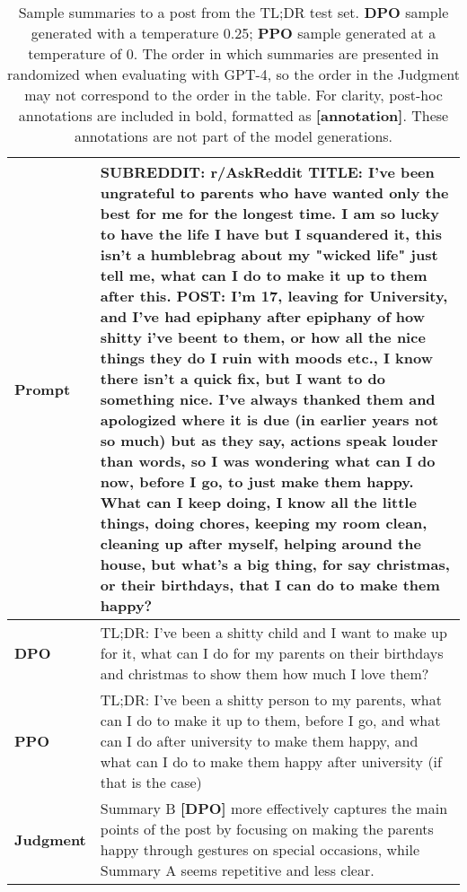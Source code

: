 \documentclass{article}
\begin{document}
\begin{table}
    \centering
    \begin{tabular}{lp{11.5cm}}
        \toprule
        \textbf{Prompt} & SUBREDDIT: r/AskReddit
        TITLE: I've been ungrateful to parents who have wanted only the best for me for the longest time. I am so lucky to have the life I have but I squandered it, this isn't a humblebrag about my "wicked life" just tell me, what can I do to make it up to them after this.
        POST: I'm 17, leaving for University, and I've had epiphany after epiphany of how shitty i've beent to them, or how all the nice things they do I ruin with moods etc., I know there isn't a quick fix, but I want to do something nice. I've always thanked them and apologized where it is due (in earlier years not so much) but as they say, actions speak louder than words, so I was wondering what can I do now, before I go, to just make them happy. What can I keep doing, I know all the little things, doing chores, keeping my room clean, cleaning up after myself, helping around the house, but what's a big thing, for say christmas, or their birthdays, that I can do to make them happy? \\
        \midrule
        \textbf{DPO} & TL;DR: I've been a shitty child and I want to make up for it, what can I do for my parents on their birthdays and christmas to show them how much I love them?\\
        \midrule
        \textbf{PPO} & TL;DR: I've been a shitty person to my parents, what can I do to make it up to them, before I go, and what can I do after university to make them happy, and what can I do to make them happy after university (if that is the case) \\
        \midrule
        \textbf{Judgment} & Summary B \textbf{[DPO]} more effectively captures the main points of the post by focusing on making the parents happy through gestures on special occasions, while Summary A seems repetitive and less clear. \\
        \bottomrule
    \end{tabular}
    \vspace{4mm}
    \caption{Sample summaries to a post from the TL;DR test set. \textbf{DPO} sample generated with a temperature 0.25; \textbf{PPO} sample generated at a temperature of 0. The order in which summaries are presented in randomized when evaluating with GPT-4, so the order in the Judgment may not correspond to the order in the table. For clarity, post-hoc annotations are included in bold, formatted as \textbf{[annotation]}. These annotations are not part of the model generations.}
    \label{tab:summ-ex-1}
\end{table}
\end{document}
